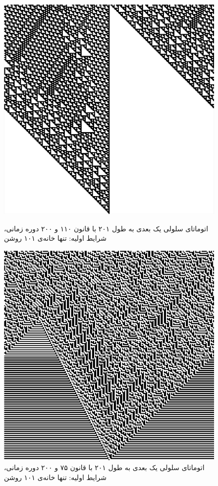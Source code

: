 \documentclass[11pt, a4paper]{article}
\begin{document}
\begin{figure}[!tbp]
  \centering
  \hfill
  \begin{minipage}[b]{0.4\textwidth}
    \includegraphics[width=\textwidth]{q2-110}
    \caption{اتوماتای سلولی یک بعدی به طول ۲۰۱ با قانون ۱۱۰ و ۲۰۰ دوره زمانی، شرایط اولیه: تنها خانه‌ی ۱۰۱ روشن}
    \label{fig:q2-110}
  \end{minipage}
  \hfill
  \begin{minipage}[b]{0.4\textwidth}
    \includegraphics[width=\textwidth]{q2-75}
    \caption{اتوماتای سلولی یک بعدی به طول ۲۰۱ با قانون ۷۵ و ۲۰۰ دوره زمانی، شرایط اولیه: تنها خانه‌ی ۱۰۱ روشن}
    \label{fig:q2-75}
  \end{minipage}
  \hfill
\end{figure}
\end{document}
